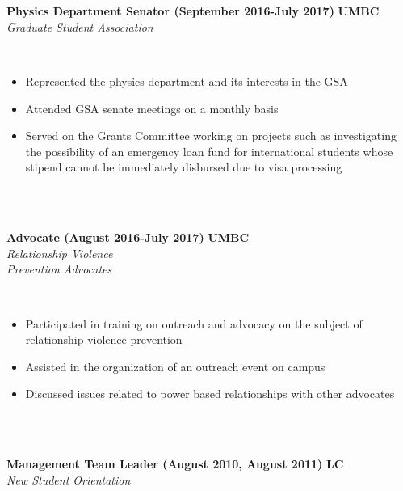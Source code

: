 \documentclass{article}
\begin{document}
\phantom \\
\phantom \\
%
%
%
%
\begin{vwcol}[widths={0.8,0.2}, sep=.8cm, justify=flush, rule=0pt, indent=0em]
\noindent \textbf{Physics Department Senator (September 2016-July 2017)}
\newpage
\noindent \textbf{UMBC}\\
\noindent \emph{Graduate Student Association}
\end{vwcol}
\phantom \\
\begin{itemize}
\item Represented the physics department and its interests in the GSA
\item Attended GSA senate meetings on a monthly basis
\item Served on the Grants Committee working on projects such as investigating the possibility of an emergency loan fund for international students whose stipend cannot be immediately disbursed due to visa processing
\end{itemize}
\phantom \\
\phantom \\
%
%
%
%
\begin{vwcol}[widths={0.8,0.2}, sep=.8cm, justify=flush, rule=0pt, indent=0em]
\noindent \textbf{Advocate (August 2016-July 2017)}
\newpage
\noindent \textbf{UMBC}\\
\noindent \emph{Relationship Violence}\\
\noindent \emph{Prevention Advocates}
\end{vwcol}
\phantom \\
\begin{itemize}
\item Participated in training on outreach and advocacy on the subject of relationship violence prevention
\item Assisted in the organization of an outreach event on campus
\item Discussed issues related to power based relationships with other advocates
\end{itemize}
\phantom \\
\phantom \\
%
%
%
%
\begin{vwcol}[widths={0.8,0.2}, sep=.8cm, justify=flush, rule=0pt, indent=0em]
\noindent \textbf{Management Team Leader (August 2010, August 2011)}
\newpage
\noindent \textbf{LC}\\
\noindent \emph{New Student Orientation}
\end{vwcol}
\end{document}
